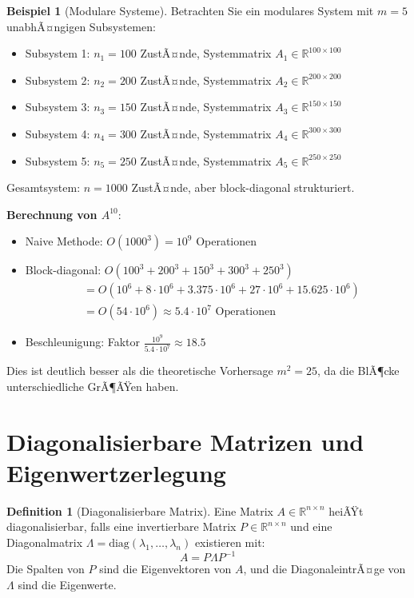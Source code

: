 ﻿\documentclass[a4paper,12pt]{report}
\theoremstyle{definition}
\newtheorem{definition}{Definition}
\newtheorem{beispiel}{Beispiel}
\begin{document}
	\begin{beispiel}[Modulare Systeme]
		Betrachten Sie ein modulares System mit $m = 5$ unabhÃ¤ngigen Subsystemen:
		\begin{itemize}
			\item Subsystem 1: $n_1 = 100$ ZustÃ¤nde, Systemmatrix $A_1 \in \mathbb{R}^{100 \times 100}$
			\item Subsystem 2: $n_2 = 200$ ZustÃ¤nde, Systemmatrix $A_2 \in \mathbb{R}^{200 \times 200}$
			\item Subsystem 3: $n_3 = 150$ ZustÃ¤nde, Systemmatrix $A_3 \in \mathbb{R}^{150 \times 150}$
			\item Subsystem 4: $n_4 = 300$ ZustÃ¤nde, Systemmatrix $A_4 \in \mathbb{R}^{300 \times 300}$
			\item Subsystem 5: $n_5 = 250$ ZustÃ¤nde, Systemmatrix $A_5 \in \mathbb{R}^{250 \times 250}$
		\end{itemize}
		
		Gesamtsystem: $n = 1000$ ZustÃ¤nde, aber block-diagonal strukturiert.
		
		\textbf{Berechnung von $A^{10}$}:
		\begin{itemize}
			\item Naive Methode: $O(1000^3) = 10^9$ Operationen
			\item Block-diagonal: $O(100^3 + 200^3 + 150^3 + 300^3 + 250^3)$
			\begin{align}
				&= O(10^6 + 8 \cdot 10^6 + 3.375 \cdot 10^6 + 27 \cdot 10^6 + 15.625 \cdot 10^6) \\
				&= O(54 \cdot 10^6) \approx 5.4 \cdot 10^7 \text{ Operationen}
			\end{align}
			\item Beschleunigung: Faktor $\frac{10^9}{5.4 \cdot 10^7} \approx 18.5$
		\end{itemize}
		
		Dies ist deutlich besser als die theoretische Vorhersage $m^2 = 25$, da die BlÃ¶cke unterschiedliche GrÃ¶ÃŸen haben.
	\end{beispiel}
	
	\section{Diagonalisierbare Matrizen und Eigenwertzerlegung}
	
	\begin{definition}[Diagonalisierbare Matrix]
		Eine Matrix $A \in \mathbb{R}^{n \times n}$ heiÃŸt diagonalisierbar, falls eine invertierbare Matrix $P \in \mathbb{R}^{n \times n}$ und eine Diagonalmatrix $\Lambda = \text{diag}(\lambda_1, \ldots, \lambda_n)$ existieren mit:
		\[
		A = P \Lambda P^{-1}
		\]
		Die Spalten von $P$ sind die Eigenvektoren von $A$, und die DiagonaleintrÃ¤ge von $\Lambda$ sind die Eigenwerte.
	\end{definition}
	
\end{document}
